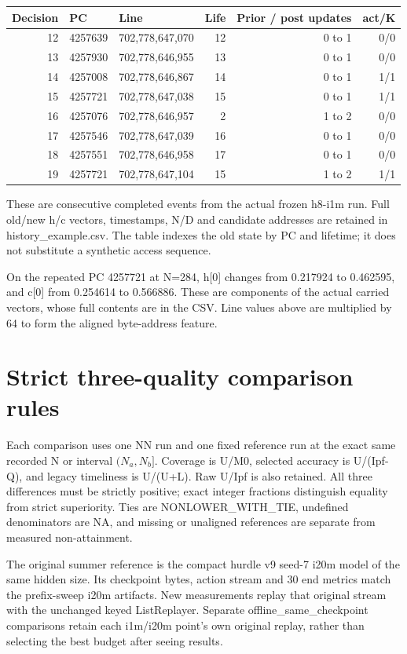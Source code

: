 \documentclass[10pt]{article}
\begin{document}
\begin{center}\scriptsize
\begin{tabular}{rllrrr}
\toprule
Decision & PC & Line & Life & Prior / post updates & act/K \\
\midrule
12 & 4257639 & 702,778,647,070 & 12 & 0 to 1 & 0/0 \\
13 & 4257930 & 702,778,646,955 & 13 & 0 to 1 & 0/0 \\
14 & 4257008 & 702,778,646,867 & 14 & 0 to 1 & 1/1 \\
15 & 4257721 & 702,778,647,038 & 15 & 0 to 1 & 1/1 \\
16 & 4257076 & 702,778,646,957 & 2 & 1 to 2 & 0/0 \\
17 & 4257546 & 702,778,647,039 & 16 & 0 to 1 & 0/0 \\
18 & 4257551 & 702,778,646,958 & 17 & 0 to 1 & 0/0 \\
19 & 4257721 & 702,778,647,104 & 15 & 1 to 2 & 1/1 \\
\bottomrule
\end{tabular}\end{center}

These are consecutive completed events from the actual frozen h8-i1m run. Full old/new h/c vectors, timestamps, N/D and candidate addresses are retained in history\_example.csv. The table indexes the old state by PC and lifetime; it does not substitute a synthetic access sequence.

On the repeated PC 4257721 at N=284, h[0] changes from 0.217924 to 0.462595, and c[0] from 0.254614 to 0.566886. These are components of the actual carried vectors, whose full contents are in the CSV. Line values above are multiplied by 64 to form the aligned byte-address feature.

\clearpage\section{Strict three-quality comparison rules}

Each comparison uses one NN run and one fixed reference run at the exact same recorded N or interval $(N_a,N_b]$. Coverage is U/M0, selected accuracy is U/(Ipf-Q), and legacy timeliness is U/(U+L). Raw U/Ipf is also retained. All three differences must be strictly positive; exact integer fractions distinguish equality from strict superiority. Ties are NONLOWER\_WITH\_TIE, undefined denominators are NA, and missing or unaligned references are separate from measured non-attainment.

The original summer reference is the compact hurdle v9 seed-7 i20m model of the same hidden size. Its checkpoint bytes, action stream and 30 end metrics match the prefix-sweep i20m artifacts. New measurements replay that original stream with the unchanged keyed ListReplayer. Separate offline\_same\_checkpoint comparisons retain each i1m/i20m point's own original replay, rather than selecting the best budget after seeing results.
\end{document}
